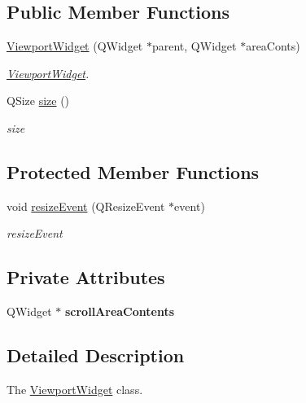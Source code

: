 \subsection*{Public Member Functions}
\begin{DoxyCompactItemize}
\item 
\hyperlink{class_viewport_widget_a0012361ba2ffd4983794291422db7e7a}{Viewport\-Widget} (Q\-Widget $\ast$parent, Q\-Widget $\ast$area\-Conts)
\begin{DoxyCompactList}\small\item\em \hyperlink{class_viewport_widget}{Viewport\-Widget}. \end{DoxyCompactList}\item 
Q\-Size \hyperlink{class_viewport_widget_a207a42f641caf95552b0352a458f8447}{size} ()
\begin{DoxyCompactList}\small\item\em size \end{DoxyCompactList}\end{DoxyCompactItemize}
\subsection*{Protected Member Functions}
\begin{DoxyCompactItemize}
\item 
void \hyperlink{class_viewport_widget_a319e0b4792e88f86ce11da6ae415930c}{resize\-Event} (Q\-Resize\-Event $\ast$event)
\begin{DoxyCompactList}\small\item\em resize\-Event \end{DoxyCompactList}\end{DoxyCompactItemize}
\subsection*{Private Attributes}
\begin{DoxyCompactItemize}
\item 
\hypertarget{class_viewport_widget_a8c9d6a8a415b90ccf0eb617831d313a4}{Q\-Widget $\ast$ {\bfseries scroll\-Area\-Contents}}\label{class_viewport_widget_a8c9d6a8a415b90ccf0eb617831d313a4}

\end{DoxyCompactItemize}


\subsection{Detailed Description}
The \hyperlink{class_viewport_widget}{Viewport\-Widget} class. 

